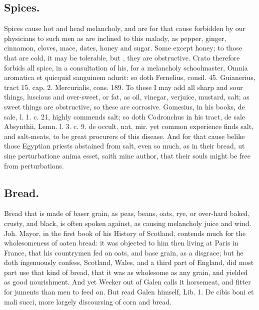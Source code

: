 {{\subsection{Spices.}
Spices cause hot and head melancholy, and are for that cause
forbidden by our physicians to such men as are inclined to this malady,
as pepper, ginger, cinnamon, cloves, mace, dates, \etc{} honey and sugar.
 Some except honey; to those that are cold, it may be tolerable,
but  , they
are obstructive. Crato therefore forbids all spice, in a consultation
of his, for a melancholy schoolmaster, Omnia aromatica et quicquid
sanguinem adurit: so doth Fernelius, consil. 45. Guianerius, tract 15.
cap. 2. Mercurialis, cons. 189. To these I may add all sharp and sour
things, luscious and over-sweet, or fat, as oil, vinegar, verjuice,
mustard, salt; as sweet things are obstructive, so these are corrosive.
Gomesius, in his books, de sale, l. 1. c. 21, highly commends salt; so
doth Codronchus in his tract, de sale Absynthii, Lemn. l. 3. c. 9. de
occult. nat. mir. yet common experience finds salt, and salt-meats, to
be great procurers of this disease. And for that cause belike those
Egyptian priests abstained from salt, even so much, as in their bread,
ut sine perturbatione anima esset, saith mine author, that their souls
might be free from perturbations.

\subsection{Bread.}
Bread that is made of baser grain, as peas, beans, oats, rye,
or over-hard baked, crusty, and black, is often spoken against,
as causing melancholy juice and wind. Joh. Mayor, in the first book of
his History of Scotland, contends much for the wholesomeness of oaten
bread: it was objected to him then living at Paris in France, that his
countrymen fed on oats, and base grain, as a disgrace; but he doth
ingenuously confess, Scotland, Wales, and a third part of England, did
most part use that kind of bread, that it was as wholesome as any
grain, and yielded as good nourishment. And yet Wecker out of Galen
calls it horsemeat, and fitter for juments than men to feed on. But
read Galen himself, Lib. 1. De cibis boni et mali succi, more largely
discoursing of corn and bread.

}}
